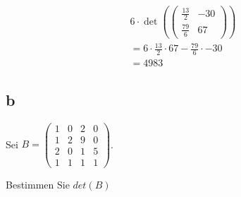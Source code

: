 \begin{align*}
    6 \cdot \det\left(\begin{pmatrix}
                              \frac{13}{2} & -30 \\ \frac{79}{6} & 67
                          \end{pmatrix}\right) \\
    = 6 \cdot \frac{13}{2} \cdot 67 - \frac{79}{6} \cdot -30 \\
    = 4983
\end{align*}

\subsection{b}

Sei $B = \begin{pmatrix}
        1 & 0 & 2 & 0 \\ 1 & 2 & 9 & 0 \\ 2 & 0 & 1 & 5 \\ 1 & 1 & 1 & 1
    \end{pmatrix}$.

Bestimmen Sie $det(B)$

